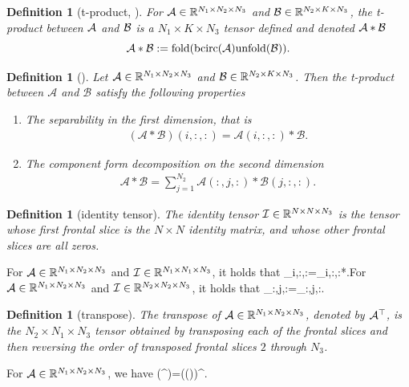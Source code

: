\documentclass[11pt]{article}
\newtheorem{definition}[theorem]{Definition}
\def\fm#1{\mathcal{#1}}
\def\r{\mathbb{R}}
\begin{document}
\begin{definition}[t-product, \cite{kilmer2011facto, kilmer2013thirdOrder}]
For $\mathcal A\in\mathbb R^{N_1\times N_2\times N_3}$ and $\mathcal B\in\mathbb R^{N_2\times K\times N_3}$, the {\it t-product} between $\mathcal A$ and $\mathcal B $ is  a $ N_1\times K\times N_3$ tensor  defined and denoted  $\mathcal A*\mathcal B$ 
$$
\mathcal A*\mathcal B:={\rm fold}({\rm bcirc}(\mathcal A){\rm unfold}(\mathcal B)).
$$	
\end{definition}

\begin{definition}[\cite{kilmer2011facto, kilmer2013thirdOrder}]
Let $\mcala \in \r^{N_1\times N_2 \times N_3}$ and $\mcalb \in \r^{N_2\times K\times N_3}$. Then the t-product between $\fm A $ and $\fm B$ satisfy the following properties
\begin{enumerate}
    \item The separability in the first dimension, that is 
    \begin{align*}
        \left( \fm A * \fm B\right)(i, :, :) = \fm A(i, :, :) * \fm B.
    \end{align*}
    \item  The component form decomposition on the second dimension
    \begin{align}
        \fm A * \fm B = \sum_{j=1}^{N_2} \fm A(:, j, :) * \fm B (j, :, :).
    \end{align}
\end{enumerate}
\end{definition}

\begin{definition}[identity tensor]
 The identity tensor $\mathcal I\in\mathbb R^{N\times N\times N_3}$ is the tensor whose first frontal slice is the $N\times N$ identity matrix, and whose other frontal slices are all zeros.	
\end{definition}
For $\mathcal A\in\mathbb R^{N_1\times N_2\times N_3}$ and $\mathcal I\in\mathbb R^{N_1\times N_1\times N_3}$, it holds that \beq\label{ii}\mcala_{i,:,:}=\mcali_{i,:,:}*\mcala.\eeq For $\mathcal A\in\mathbb R^{N_1\times N_2\times N_3}$ and $\mathcal I\in\mathbb R^{N_2\times N_2\times N_3}$, it holds that \beq\label{ij}\mcala_{:,j,:}=\mcala*\mcali_{:,j,:}.\eeq

\begin{definition}[transpose]
The transpose of $\mathcal A\in\mathbb R^{N_1\times N_2\times N_3}$, denoted by $\mathcal A^\top$, is the $N_2\times N_1\times N_3$ tensor obtained by transposing each of the frontal slices and then reversing the order of transposed frontal slices $2$ through $N_3$.
\end{definition} 
For $\mathcal A\in\mathbb R^{N_1\times N_2\times N_3}$, we have  \beq\label{ttop}\bcirc(\mcala^\top)=(\bcirc(\mcala))^\top.\eeq %
   
\end{document}
